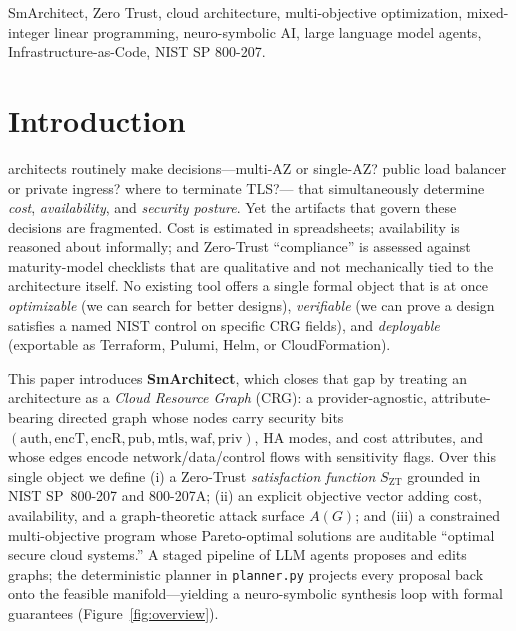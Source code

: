 \documentclass[journal]{IEEEtran}
\theoremstyle{plain}
\theoremstyle{definition}
\newcommand{\G}{G}
\newcommand{\Szt}{S_{\mathrm{ZT}}}
\newcommand{\code}[1]{\texttt{\small #1}}
\begin{document}
\begin{IEEEkeywords}
SmArchitect, Zero Trust, cloud architecture, multi-objective optimization,
mixed-integer linear programming, neuro-symbolic AI, large language model agents,
Infrastructure-as-Code, NIST SP 800-207.
\end{IEEEkeywords}

\section{Introduction}
 architects routinely make decisions---multi-AZ or
single-AZ? public load balancer or private ingress? where to terminate TLS?---
that simultaneously determine \emph{cost}, \emph{availability}, and
\emph{security posture}. Yet the artifacts that govern these decisions are
fragmented. Cost is estimated in spreadsheets; availability is reasoned about
informally; and Zero-Trust ``compliance'' is assessed against maturity-model
checklists that are qualitative and not mechanically tied to the architecture
itself. No existing tool offers a single formal object that is at once
\emph{optimizable} (we can search for better designs), \emph{verifiable} (we can
prove a design satisfies a named NIST control on specific CRG fields), and
\emph{deployable} (exportable as Terraform, Pulumi, Helm, or CloudFormation).

This paper introduces \textbf{SmArchitect}, which closes that gap by treating an
architecture as a \emph{Cloud Resource Graph} (CRG): a provider-agnostic,
attribute-bearing directed graph whose nodes carry security bits
$(\text{auth},\text{encT},\text{encR},\text{pub},\text{mtls},\text{waf},\text{priv})$,
HA modes, and cost attributes, and whose edges encode network/data/control flows
with sensitivity flags. Over this single object we define (i) a Zero-Trust
\emph{satisfaction function} $\Szt$ grounded in NIST SP~800-207 and 800-207A;
(ii) an explicit objective vector adding cost, availability, and a
graph-theoretic attack surface $A(\G)$; and (iii) a constrained multi-objective
program whose Pareto-optimal solutions are auditable ``optimal secure cloud
systems.'' A staged pipeline of LLM agents proposes and edits graphs; the
deterministic planner in \code{planner.py} projects every proposal back onto the
feasible manifold---yielding a neuro-symbolic synthesis loop with formal
guarantees (Figure~\ref{fig:overview}).
\end{document}
